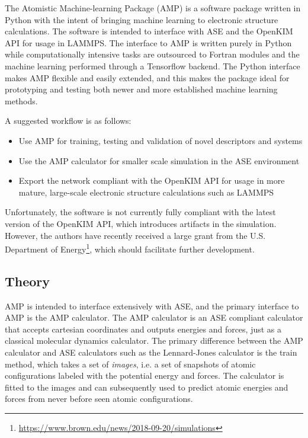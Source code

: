 The Atomistic Machine-learning Package (AMP) 
\parencite[Khorshidi, Alizera and Peterson, Andrew A.]{khorshidi2016amp}
is a software package
written in Python with the intent of bringing machine learning
to electronic structure calculations. The software is intended
to interface with ASE and the OpenKIM API for usage
in LAMMPS. The interface to AMP is written purely in Python
while computationally intensive tasks are outsourced to Fortran
modules and the machine learning performed through a Tensorflow
backend. The Python interface makes AMP flexible and easily
extended, and this makes the package ideal for prototyping
and testing both newer and more established machine learning
methods.
\par
A suggested workflow is as follows:

\begin{itemize}
    \item Use AMP for training, testing and validation
        of novel descriptors and systems
    \item Use the AMP calculator for smaller scale
        simulation in the ASE environment
    \item Export the network compliant with the OpenKIM
        API for usage in more mature, large-scale
        electronic structure calculations such as LAMMPS
\end{itemize}

Unfortunately, the software is not currently fully compliant
with the latest version of the OpenKIM API,
which introduces artifacts in the simulation.
However, the authors have recently received a large grant
from the U.S. Department of Energy\footnote{\url{
https://www.brown.edu/news/2018-09-20/simulations}}, 
which should facilitate further development.

\subsection{Theory}
AMP is intended to interface extensively with ASE,
and the primary interface to AMP is the AMP calculator.
The AMP calculator is an ASE compliant calculator
that accepts cartesian coordinates and outputs energies
and forces, just as a classical molecular dynamics calculator.
The primary difference between the AMP calculator
and ASE calculators such as the Lennard-Jones calculator
is the train method, which takes a set of \textit{images}, i.e.
a set of snapshots of atomic configurations labeled
with the potential energy and forces.
The calculator is fitted to the images and can subsequently
used to predict atomic energies and forces from never before seen
atomic configurations.

